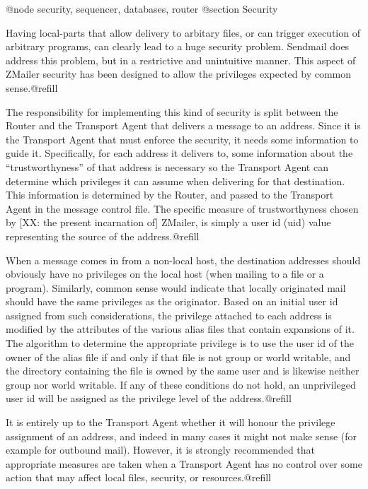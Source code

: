 {{@node security, sequencer, databases, router
@section Security

Having local-parts that allow delivery to arbitary files, or can trigger
execution of arbitrary programs, can clearly lead to a huge security problem.
Sendmail does address this problem, but in a restrictive and unintuitive
manner.  This aspect of ZMailer security has been designed to allow the
privileges expected by common sense.@refill

The responsibility for implementing this kind of security is split between
the Router and the Transport Agent that delivers a message to an address.
Since it is the Transport Agent that must enforce the security, it needs
some information to guide it.  Specifically, for each address it delivers
to, some information about the ``trustworthyness'' of that address is
necessary so the Transport Agent can determine which privileges it can
assume when delivering for that destination.  This information is determined
by the Router, and passed to the Transport Agent in the message control file.
The specific measure of trustworthyness chosen by [XX: the present
incarnation of] ZMailer, is simply a user id (uid) value representing the
source of the address.@refill

When a message comes in from a non-local host, the destination addresses
should obviously have no privileges on the local host (when mailing to a file
or a program).  Similarly, common sense would indicate that locally
originated mail should have the same privileges as the originator.  Based on
an initial user id assigned from such considerations, the privilege attached
to each address is modified by the attributes of the various alias files that
contain expansions of it.  The algorithm to determine the appropriate
privilege is to use the user id of the owner of the alias file if and only
if that file is not group or world writable, and the directory containing the
file is owned by the same user and is likewise neither group nor world
writable.  If any of these conditions do not hold, an unprivileged user id
will be assigned as the privilege level of the address.@refill

It is entirely up to the Transport Agent whether it will honour the privilege
assignment of an address, and indeed in many cases it might not make sense
(for example for outbound mail).  However, it is strongly recommended that
appropriate measures are taken when a Transport Agent has no control over
some action that may affect local files, security, or resources.@refill

}}
